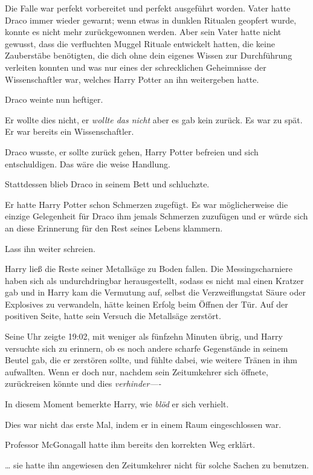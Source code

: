 {Die Falle war perfekt vorbereitet und perfekt ausgeführt worden. Vater hatte Draco immer wieder gewarnt; wenn etwas in dunklen Ritualen geopfert wurde, konnte es nicht mehr zurückgewonnen werden. Aber sein Vater hatte nicht gewusst, dass die verfluchten Muggel Rituale entwickelt hatten, die keine Zauberstäbe benötigten, die dich ohne dein eigenes Wissen zur Durchführung verleiten konnten und was nur eines der schrecklichen Geheimnisse der Wissenschaftler war, welches Harry Potter an ihn weitergeben hatte.

Draco weinte nun heftiger.

Er wollte dies nicht, er \emph{wollte das nicht} aber es gab kein zurück. Es war zu spät. Er war bereits ein Wissenschaftler.

Draco wusste, er sollte zurück gehen, Harry Potter befreien und sich entschuldigen. Das wäre die weise Handlung.

Stattdessen blieb Draco in seinem Bett und schluchzte.

Er hatte Harry Potter schon Schmerzen zugefügt. Es war möglicherweise die einzige Gelegenheit für Draco ihm jemals Schmerzen zuzufügen und er würde sich an diese Erinnerung für den Rest seines Lebens klammern.

Lass ihn weiter schreien.

Harry ließ die Reste seiner Metallsäge zu Boden fallen. Die Messingscharniere haben sich als undurchdringbar herausgestellt, sodass es nicht mal einen Kratzer gab und in Harry kam die Vermutung auf, selbst die Verzweiflungstat Säure oder Explosives zu verwandeln, hätte keinen Erfolg beim Öffnen der Tür. Auf der positiven Seite, hatte sein Versuch die Metallsäge zerstört.

Seine Uhr zeigte 19:02, mit weniger als fünfzehn Minuten übrig, und Harry versuchte sich zu erinnern, ob es noch andere scharfe Gegenstände in seinem Beutel gab, die er zerstören sollte, und fühlte dabei, wie weitere Tränen in ihm aufwallten. Wenn er doch nur, nachdem sein Zeitumkehrer sich öffnete, zurückreisen könnte und dies \emph{verhinder----}

In diesem Moment bemerkte Harry, wie \emph{blöd} er sich verhielt.

Dies war nicht das erste Mal, indem er in einem Raum eingeschlossen war.

Professor McGonagall hatte ihm bereits den korrekten Weg erklärt.

… sie hatte ihn angewiesen den Zeitumkehrer nicht für solche Sachen zu benutzen.

}
